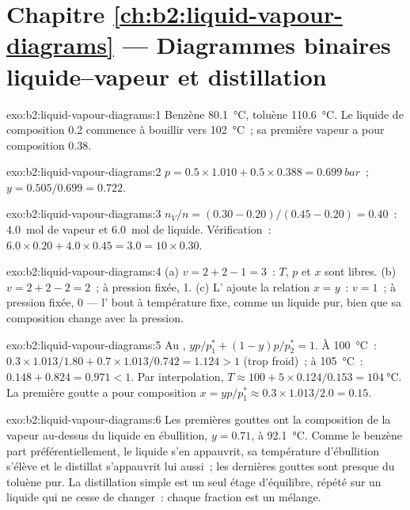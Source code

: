 \section*{Chapitre \ref{ch:b2:liquid-vapour-diagrams} --- Diagrammes binaires liquide--vapeur et distillation}

\begin{solution}{exo:b2:liquid-vapour-diagrams:1}
Benzène \qty{80.1}{\degreeCelsius}, toluène \qty{110.6}{\degreeCelsius}. Le liquide
de composition 0.2 commence à bouillir vers \qty{102}{\degreeCelsius}~; sa première
vapeur a pour composition 0.38.
\end{solution}

\begin{solution}{exo:b2:liquid-vapour-diagrams:2}
$p = 0.5 \times 1.010 + 0.5 \times 0.388 = \qty{0.699}{bar}$~;
$y = 0.505/0.699 = 0.722$.
\end{solution}

\begin{solution}{exo:b2:liquid-vapour-diagrams:3}
$n_V/n = (0.30 - 0.20)/(0.45 - 0.20) = 0.40$~: \qty{4.0}{mol} de vapeur et
\qty{6.0}{mol} de liquide. Vérification~: $6.0 \times 0.20 + 4.0 \times 0.45 = 3.0 = 10
\times 0.30$.
\end{solution}

\begin{solution}{exo:b2:liquid-vapour-diagrams:4}
(a) $v = 2 + 2 - 1 = 3$~: $T$, $p$ et $x$ sont libres. (b) $v = 2 + 2 - 2 = 2$~; à
pression fixée, 1. (c) L' ajoute la relation $x = y$~: $v = 1$~; à pression
fixée, 0 --- l' bout à température fixe, comme un liquide pur,
bien que sa composition change avec la pression.
\end{solution}

\begin{solution}{exo:b2:liquid-vapour-diagrams:5}
Au , $yp/p_1^* + (1 - y)p/p_2^* = 1$. À \qty{100}{\degreeCelsius}~:
$0.3 \times 1.013/1.80 + 0.7 \times 1.013/0.742 = 1.124 > 1$ (trop froid)~; à
\qty{105}{\degreeCelsius}~: $0.148 + 0.824 = 0.971 < 1$. Par interpolation, $T \approx
100 + 5 \times 0.124/0.153 = \qty{104}{\degreeCelsius}$. La première goutte a pour composition $x =
yp/p_1^* \approx 0.3 \times 1.013/2.0 = 0.15$.
\end{solution}

\begin{solution}{exo:b2:liquid-vapour-diagrams:6}
Les premières gouttes ont la composition de la vapeur au-dessus du liquide en ébullition,
$y = 0.71$, à \qty{92.1}{\degreeCelsius}. Comme le benzène part préférentiellement, le
liquide s'en appauvrit, sa température d'ébullition s'élève et le distillat s'appauvrit
lui aussi~; les dernières gouttes sont presque du toluène pur. La distillation simple est un
seul étage d'équilibre, répété sur un liquide qui ne cesse de changer~: chaque
fraction est un mélange.
\end{solution}

